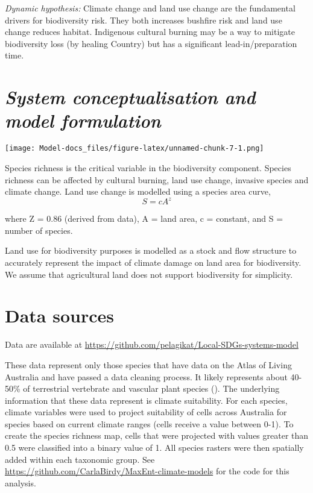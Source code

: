 \documentclass[
  11pt,
]{book}
\begin{document}
\emph{Dynamic hypothesis:}
Climate change and land use change are the fundamental drivers for biodiversity risk. They both increases bushfire risk and land use change reduces habitat. Indigenous cultural burning may be a way to mitigate biodiversity loss (by healing Country) but has a significant lead-in/preparation time.

\hypertarget{system-conceptualisation-and-model-formulation-1}{%
\section{\texorpdfstring{\emph{System conceptualisation and model formulation}}{System conceptualisation and model formulation}}\label{system-conceptualisation-and-model-formulation-1}}

\texttt{[image: Model-docs\_files/figure-latex/unnamed-chunk-7-1.png]}

Species richness is the critical variable in the biodiversity component. Species richness can be affected by cultural burning, land use change, invasive species and climate change. Land use change is modelled using a species area curve,
\[
S = cA^z 
\]

where Z = 0.86 (derived from data), A = land area, c = constant, and S = number of species.

Land use for biodiversity purposes is modelled as a stock and flow structure to accurately represent the impact of climate damage on land area for biodiversity. We assume that agricultural land does not support biodiversity for simplicity.

\hypertarget{data-sources-4}{%
\section{Data sources}\label{data-sources-4}}

Data are available at \url{https://github.com/pelagikat/Local-SDGs-systems-model}

These data represent only those species that have data on the Atlas of Living Australia and have passed a data cleaning process. It likely represents about 40-50\% of terrestrial vertebrate and vascular plant species (\citet{graham_climate_2019}). The underlying information that these data represent is climate suitability. For each species, climate variables were used to project suitability of cells across Australia for species based on current climate ranges (cells receive a value between 0-1). To create the species richness map, cells that were projected with values greater than 0.5 were classified into a binary value of 1. All species rasters were then spatially added within each taxonomic group. See \url{https://github.com/CarlaBirdy/MaxEnt-climate-models} for the code for this analysis.
\end{document}
